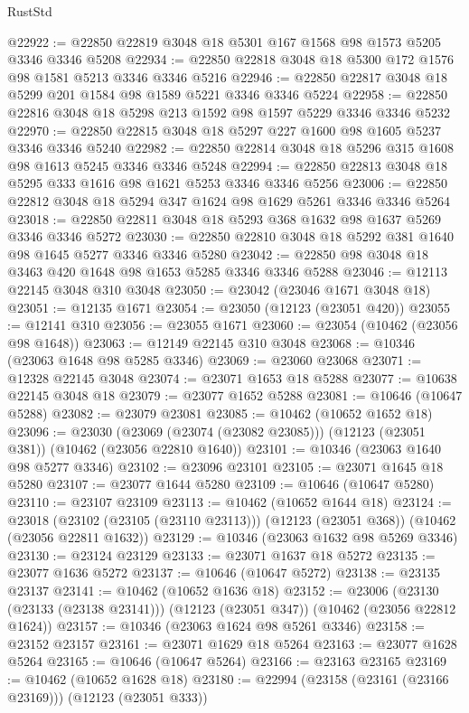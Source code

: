 \begin{lexlean}{RustStd}
\begin{coremodule}
@22922 := @22850 @22819 @3048 @18 @5301 @167 @1568 @98 @1573 @5205 @3346 @3346 @5208
@22934 := @22850 @22818 @3048 @18 @5300 @172 @1576 @98 @1581 @5213 @3346 @3346 @5216
@22946 := @22850 @22817 @3048 @18 @5299 @201 @1584 @98 @1589 @5221 @3346 @3346 @5224
@22958 := @22850 @22816 @3048 @18 @5298 @213 @1592 @98 @1597 @5229 @3346 @3346 @5232
@22970 := @22850 @22815 @3048 @18 @5297 @227 @1600 @98 @1605 @5237 @3346 @3346 @5240
@22982 := @22850 @22814 @3048 @18 @5296 @315 @1608 @98 @1613 @5245 @3346 @3346 @5248
@22994 := @22850 @22813 @3048 @18 @5295 @333 @1616 @98 @1621 @5253 @3346 @3346 @5256
@23006 := @22850 @22812 @3048 @18 @5294 @347 @1624 @98 @1629 @5261 @3346 @3346 @5264
@23018 := @22850 @22811 @3048 @18 @5293 @368 @1632 @98 @1637 @5269 @3346 @3346 @5272
@23030 := @22850 @22810 @3048 @18 @5292 @381 @1640 @98 @1645 @5277 @3346 @3346 @5280
@23042 := @22850 @98 @3048 @18 @3463 @420 @1648 @98 @1653 @5285 @3346 @3346 @5288
@23046 := @12113 @22145 @3048 @310 @3048
@23050 := @23042 (@23046 @1671 @3048 @18)
@23051 := @12135 @1671
@23054 := @23050 (@12123 (@23051 @420))
@23055 := @12141 @310
@23056 := @23055 @1671
@23060 := @23054 (@10462 (@23056 @98 @1648))
@23063 := @12149 @22145 @310 @3048
@23068 := @10346 (@23063 @1648 @98 @5285 @3346)
@23069 := @23060 @23068
@23071 := @12328 @22145 @3048
@23074 := @23071 @1653 @18 @5288
@23077 := @10638 @22145 @3048 @18
@23079 := @23077 @1652 @5288
@23081 := @10646 (@10647 @5288)
@23082 := @23079 @23081
@23085 := @10462 (@10652 @1652 @18)
@23096 := @23030
    (@23069 (@23074 (@23082 @23085)))
    (@12123 (@23051 @381))
    (@10462 (@23056 @22810 @1640))
@23101 := @10346 (@23063 @1640 @98 @5277 @3346)
@23102 := @23096 @23101
@23105 := @23071 @1645 @18 @5280
@23107 := @23077 @1644 @5280
@23109 := @10646 (@10647 @5280)
@23110 := @23107 @23109
@23113 := @10462 (@10652 @1644 @18)
@23124 := @23018
    (@23102 (@23105 (@23110 @23113)))
    (@12123 (@23051 @368))
    (@10462 (@23056 @22811 @1632))
@23129 := @10346 (@23063 @1632 @98 @5269 @3346)
@23130 := @23124 @23129
@23133 := @23071 @1637 @18 @5272
@23135 := @23077 @1636 @5272
@23137 := @10646 (@10647 @5272)
@23138 := @23135 @23137
@23141 := @10462 (@10652 @1636 @18)
@23152 := @23006
    (@23130 (@23133 (@23138 @23141)))
    (@12123 (@23051 @347))
    (@10462 (@23056 @22812 @1624))
@23157 := @10346 (@23063 @1624 @98 @5261 @3346)
@23158 := @23152 @23157
@23161 := @23071 @1629 @18 @5264
@23163 := @23077 @1628 @5264
@23165 := @10646 (@10647 @5264)
@23166 := @23163 @23165
@23169 := @10462 (@10652 @1628 @18)
@23180 := @22994
    (@23158 (@23161 (@23166 @23169)))
    (@12123 (@23051 @333))

\end{coremodule}
\end{lexlean}

